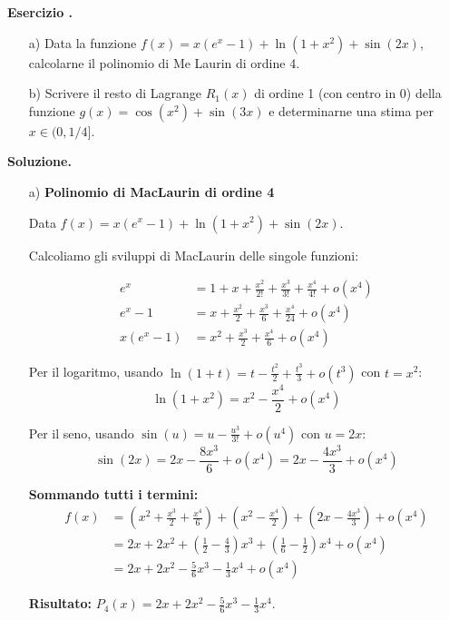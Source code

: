 \documentclass[12pt, a4paper]{article}
\newcounter{examcounter}
\newcounter{exercisecounter}[examcounter]
\newenvironment{exercise}{%
    \stepcounter{exercisecounter}%
    \par\noindent\textbf{Esercizio \theexercisecounter.}\medskip\par
    \normalfont
}{\par\bigskip}
\newenvironment{solution}{%
    \par\noindent\textbf{Soluzione.}\medskip\par
    \normalfont
}{\par\bigskip}
\begin{document}
\begin{exercise}
\begin{enumerate}
    \item[a)] Data la funzione $f(x) = x(e^{x}-1) + \ln(1+x^{2}) + \sin(2x)$, calcolarne il polinomio di Me Laurin di ordine 4.
    \item[b)] Scrivere il resto di Lagrange $R_{1}(x)$ di ordine 1 (con centro in 0) della funzione $g(x) = \cos(x^{2}) + \sin(3x)$ e determinarne una stima per $x \in (0, 1/4]$.
\end{enumerate}
\end{exercise}
\begin{solution}
\begin{enumerate}
    \item[a)] \textbf{Polinomio di MacLaurin di ordine 4}
    
    Data $f(x) = x(e^{x}-1) + \ln(1+x^{2}) + \sin(2x)$.
    
    Calcoliamo gli sviluppi di MacLaurin delle singole funzioni:
    
    \begin{align}
        e^x &= 1 + x + \frac{x^2}{2!} + \frac{x^3}{3!} + \frac{x^4}{4!} + o(x^4) \\
        e^x - 1 &= x + \frac{x^2}{2} + \frac{x^3}{6} + \frac{x^4}{24} + o(x^4) \\
        x(e^x - 1) &= x^2 + \frac{x^3}{2} + \frac{x^4}{6} + o(x^4)
    \end{align}
    
    Per il logaritmo, usando $\ln(1+t) = t - \frac{t^2}{2} + \frac{t^3}{3} + o(t^3)$ con $t = x^2$:
    \[\ln(1+x^2) = x^2 - \frac{x^4}{2} + o(x^4)\]
    
    Per il seno, usando $\sin(u) = u - \frac{u^3}{3!} + o(u^4)$ con $u = 2x$:
    \[\sin(2x) = 2x - \frac{8x^3}{6} + o(x^4) = 2x - \frac{4x^3}{3} + o(x^4)\]
    
    \textbf{Sommando tutti i termini:}
    \begin{align}
        f(x) &= \left(x^2 + \frac{x^3}{2} + \frac{x^4}{6}\right) + \left(x^2 - \frac{x^4}{2}\right) + \left(2x - \frac{4x^3}{3}\right) + o(x^4) \\
        &= 2x + 2x^2 + \left(\frac{1}{2} - \frac{4}{3}\right)x^3 + \left(\frac{1}{6} - \frac{1}{2}\right)x^4 + o(x^4) \\
        &= 2x + 2x^2 - \frac{5}{6}x^3 - \frac{1}{3}x^4 + o(x^4)
    \end{align}
    
    \textbf{Risultato:} $P_4(x) = 2x + 2x^2 - \frac{5}{6}x^3 - \frac{1}{3}x^4$.


\end{enumerate}
\end{solution}
\end{document}
